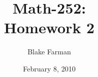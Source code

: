 \documentclass[10pt]{amsart}
\author{Blake Farman}
\title{Math-252:\\Homework 2}
\date{February 8, 2010}\pdfpagewidth 8.5in
\begin{document}
\maketitle

\newcommand{\Z}{\mathbb{Z}}
\newcommand{\R}{\mathbb{R}}
\newcommand{\Q}{\mathbb{Q}}

\renewcommand{\qedsymbol}{\(\blacksquare\)}
\newcommand{\znz}[1]{\Z / #1\Z}
\newcommand{\mznz}[1]{(\Z / #1\Z)^*}

\renewcommand{\phi}{\varphi}
\newenvironment{alphaenum}{
  \begin{enumerate}
    \renewcommand{\theenumi}{(\alph{enumi})}
    \renewcommand{\labelenumi}{\theenumi}
  }
  {\end{enumerate}}

\newcommand{\quadeq}[3]{\frac{-(#2) \pm \sqrt{(#2)^2 - 4(#1)(#3)}}{2(#3)}}
\end{document}
